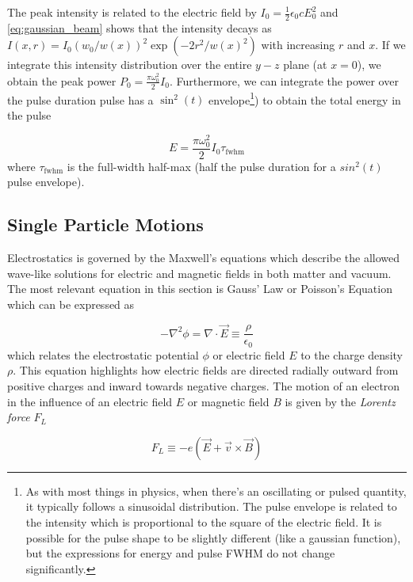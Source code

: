 The peak intensity is related to the electric field by $I_0 = \frac{1}{2} \epsilon_0 c E_0^2$ and \cref{eq:gaussian_beam} shows that the intensity decays as $I(x, r) = I_0 (w_0 / w(x))^2 \exp(-2 r^2 / w(x)^2)$ with increasing $r$ and $x$. If we integrate this intensity distribution over the entire $y-z$ plane (at $x=0$), we obtain the peak power $P_0 = \frac{\pi \omega_0^2}{2} I_0$. Furthermore, we can integrate the power over the pulse duration pulse has a $\sin^2(t)$ envelope\footnote{As with most things in physics, when there's an oscillating or pulsed quantity, it typically follows a sinusoidal distribution. The pulse envelope is related to the intensity which is proportional to the square of the electric field. It is possible for the pulse shape to be slightly different (like a gaussian function), but the expressions for energy and pulse \gls{FWHM} do not change significantly.}) to obtain the total energy in the pulse 

\begin{equation}
	E = \frac{\pi \omega_0^2}{2} I_0 \tau_\text{fwhm} \label{eq:gaussian_beam_energy}
\end{equation}
where $\tau_\text{fwhm}$ is the full-width half-max (half the pulse duration for a $sin^2(t)$ pulse envelope). 

\subsection{Single Particle Motions}

Electrostatics is governed by the Maxwell's equations which describe the allowed wave-like solutions for electric and magnetic fields in both matter and vacuum. The most relevant equation in this section is Gauss' Law or Poisson's Equation which can be expressed as 

\begin{equation}
	- \nabla^2 \phi = \nabla \cdot \vec{E} \equiv \frac{\rho}{\epsilon_0} \label{eq:poisson}
\end{equation}
which relates the electrostatic potential $\phi$ or electric field $E$ to the charge density $\rho$. This equation highlights how electric fields are directed radially outward from positive charges and inward towards negative charges. The motion of an electron in the influence of an electric field $E$ or magnetic field $B$ is given by the \emph{Lorentz force} $F_L$

\begin{equation}
	F_L \equiv -e (\vec{E} + \vec{v} \times \vec{B}) \label{eq:lorentz}
\end{equation}

